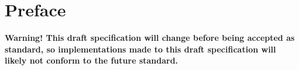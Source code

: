 \chapter{Preface}

{\bf Warning! This draft specification will change before being accepted as
standard, so implementations made to this draft specification will likely not
conform to the future standard.}
